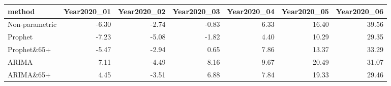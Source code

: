 \begin{table}[ht]
\centering
\begin{tabular}{lrrrrrr}
  \hline
method & Year2020\_01 & Year2020\_02 & Year2020\_03 & Year2020\_04 & Year2020\_05 & Year2020\_06 \\ 
  \hline
Non-parametric & -6.30 & -2.74 & -0.83 & 6.33 & 16.40 & 39.56 \\ 
  Prophet & -7.23 & -5.08 & -1.82 & 4.40 & 10.29 & 29.35 \\ 
  Prophet\&65+ & -5.47 & -2.94 & 0.65 & 7.86 & 13.37 & 33.29 \\ 
  ARIMA & 7.11 & -4.49 & 8.16 & 9.67 & 20.49 & 31.07 \\ 
  ARIMA\&65+ & 4.45 & -3.51 & 6.88 & 7.84 & 19.33 & 29.46 \\ 
   \hline
\end{tabular}
\end{table}
